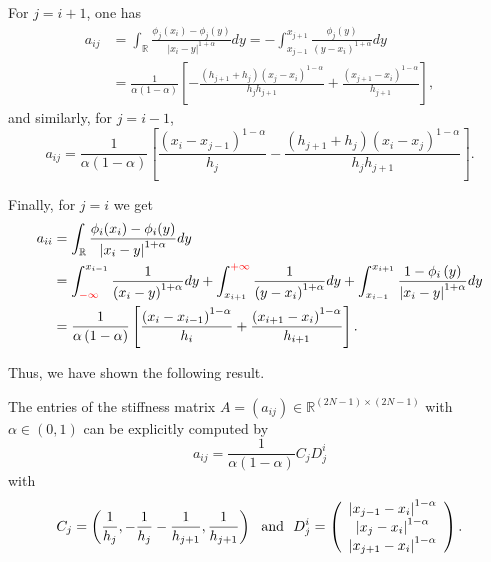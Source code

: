 \documentclass[smallextended]{svjour3}       %
\newcommand{\tcr}[1]{\textcolor{red}{#1}}
\begin{document}
For $j=i+1$, one has
	\begin{equation*}
		\begin{split}
			a_{ij}
			&= \int_{\mathbb{R}}\frac{\phi_j(x_i)-\phi_j(y)}{\left | x_i-y \right |^{1+\alpha } }dy= -\int_{x_{j-1}}^{x_{j+1}} \frac{\phi_j(y)}{( y-x_i )^{1+\alpha } }dy\\
			&=\frac{1}{\alpha (1-\alpha )} \left [  - \frac{(h_{j+1}+h_{j})(x_{j}-x_{i})^{1-\alpha }}{h_{j}h_{j+1}} +\frac{(x_{j+1}-x_i)^{1-\alpha }}{h_{j+1}} \right ],
		\end{split}
	\end{equation*}
and similarly, for $j= i-1$, 
	\begin{equation*}
		a_{ij}=\frac{1}{\alpha (1-\alpha )} \left [ \frac{(x_i-x_{j-1})^{1-\alpha }}{h_j} - \frac{(h_{j+1}+h_{j})(x_{i}-x_{j})^{1-\alpha }}{h_{j}h_{j+1}} \right ].
	\end{equation*}
	
Finally, for $j=i$ we get
\begin{equation*}
		\begin{split}
			a_{ii}
			&= \int_{\mathbb{R}}\frac{\phi_i(x_i)-\phi_i(y)}{\left | x_i-y \right |^{1+\alpha } }dy\\
			&=\int_{\tcr{-\infty}}^{x_{i-1}} {\frac{1}{\left( x_i-y \right) ^{1+\alpha}}dy}
				+\int_{x_{i+1}}^{\tcr{+\infty}} {\frac{1}{\left( y-x_i \right) ^{1+\alpha}}dy}
				+\int_{x_{i-1}}^{x_{i+1}}{\frac{1 -\phi _i\left( y \right)}{\left| x_i-y \right|^{1+\alpha}}dy}\\
			&=\frac{1}{\alpha \left( 1-\alpha \right)}\left[ \frac{\left( x_i-x_{i-1} \right) ^{1-\alpha}}{h_i}+\frac{\left( x_{i+1}-x_i \right) ^{1-\alpha}}{ h_{i+1} } \right].
		\end{split}
\end{equation*}
	
Thus, we have shown the following result. 
	
	\begin{lemma}\label{addLemma2.1}
		The entries of the stiffness matrix $A=(a_{ij})\in\mathbb{R}^{\left(2N-1\right)\times \left(2N-1\right)}$ with $\alpha \in (0,1)$ can be explicitly computed by
		\begin{equation*}
			a_{ij}=\frac{1}{\alpha(1-\alpha)}C_{j}D_j^i
		\end{equation*}
		with
		\begin{equation*}
			C_j= \left(\frac{1}{h_{j}},-\frac{1}{h_{j}}-\frac{1}{h_{j+1}},\frac{1}{h_{j+1}}\right)
			\ ~{\rm and}~ \ D_{j}^{i}=\left( \begin{array}{c}	\left| x_{j-1}-x_i \right|^{1-\alpha}\\	\left| x_j-x_i \right|^{1-\alpha}\\	\left| x_{j+1}-x_i \right|^{1-\alpha}\\\end{array} \right).
		\end{equation*}
	\end{lemma}
	
\end{document}
